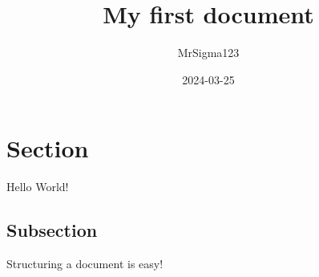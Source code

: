 \documentclass{article}
\title{My first document}
\date{2024-03-25}
\author{MrSigma123}
\begin{document}
	\maketitle
	\newpage
	
	\section{Section}
	
	Hello World!
	
	\subsection{Subsection}
	
	Structuring a document is easy!
	
\end{document}
